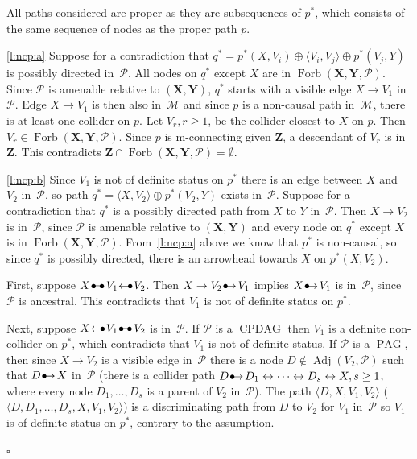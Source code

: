 \documentclass[11pt,a4paper]{article}
\newenvironment{proofof}[1][]{\begin{trivlist}
   \item[\hskip \labelsep {\bfseries Proof of #1.}]}{\hfill{}$\square$\end{trivlist}}
\DeclareMathOperator{\CPDAG}{CPDAG}
\DeclareMathOperator{\PAG}{PAG}
\DeclareMathOperator{\Adj}{Adj}
\DeclareMathOperator{\Forbi}{Forb}
\newcommand{\g}[1][G]{\mathcal{#1}}
\newcommand{\fb}[2][X,Y]{\Forbi(\mathbf{#1},#2)}%
\newcommand{\pstar}[1][p]{{#1}^{*}}
\newcommand{\bulletbullet}{
  \setlength{\unitlength}{1mm}
  \begin{picture}(5,1)(0,0)
    \put(0.2,0){$\bullet$}
    \put(1.3,1){\line(1,0){2.4}}
    \put(2.8,0){$\bullet$}
  \end{picture}
}
\newcommand{\bulletarrow}{
  \setlength{\unitlength}{1mm}
  \begin{picture}(5,1)(0,0)
    \put(0.2,0){$\bullet$}
    \put(1,0){$\rightarrow$}
  \end{picture}
}
\newcommand{\arrowbullet}{
  \setlength{\unitlength}{1mm}
  \begin{picture}(5,1)(0,0)
    \put(0.2,0){$\leftarrow$}
    \put(3,0){$\bullet$}
  \end{picture}
}
\begin{document}
\begin{proofof}[Lemma~\ref{lemma:non-causal path}]
All paths considered are proper as they are subsequences of $\pstar$, which consists of the same sequence of nodes as the proper path $p$.

\ref{l:ncp:a} Suppose for a contradiction that $\pstar[q] = \pstar(X,V_i) \oplus \langle V_i, V_j \rangle \oplus \pstar(V_j,Y) $ is possibly directed in~$\g[P]$. All nodes on $\pstar[q]$ except $X$ are in $\fb{\g[P]}$. Since $\g[P]$ is amenable relative to $(\mathbf{X,Y})$, $\pstar[q]$ starts with a visible edge $X \rightarrow V_1$ in~$\g[P]$.
Edge $X \rightarrow V_1$ is then also in~$\g[M]$ and since $p$ is a non-causal path in~$\g[M]$, there is at least one collider on $p$.
Let $V_r, r \ge 1$, be the collider closest to $X$ on $p$. Then $V_r \in \fb{\g[P]}$. Since $p$ is m-connecting given $\mathbf{Z}$, a descendant of $V_r$ is in $\mathbf{Z}$. This contradicts $\mathbf{Z} \cap \fb{\g[P]} = \emptyset$.


\ref{l:ncp:b} Since $V_1$ is not of definite status on $\pstar$ there is an edge between $X$ and $V_2$ in~$\g[P]$, so path $\pstar[q]= \langle X,V_2 \rangle \oplus \pstar(V_2,Y) $ exists in~$\g[P]$.
Suppose for a contradiction that $\pstar[q]$ is a possibly directed path from $X$ to $Y$ in~$\g[P]$. Then $X \to V_2$ is in~$\g[P]$, since $\g[P]$ is amenable relative to $(\mathbf{X,Y})$ and every node on $\pstar[q]$ except $X$ is in $\fb{\g[P]}$.
From~\ref{l:ncp:a} above we know that $\pstar$ is non-causal, so since $\pstar[q]$ is possibly directed, there is an arrowhead towards $X$ on $\pstar(X,V_2)$.

First, suppose $X \bulletbullet V_1 \arrowbullet V_2$. Then $X \rightarrow V_2 \bulletarrow V_1$ implies $X \bulletarrow V_1$ is in~$\g[P]$, since $\g[P]$ is ancestral. This contradicts that $V_1$ is not of definite status on $\pstar$.

Next, suppose $X \arrowbullet V_1 \bulletbullet V_2$ is in~$\g[P]$. If $\g[P]$ is a $\CPDAG$ then $V_1$ is a definite non-collider on $\pstar$, which contradicts that $V_1$ is not of definite status.
If $\g[P]$ is a $\PAG$, then since $X \rightarrow V_{2}$ is a visible edge in~$\g[P]$ there is a node $D \notin \Adj(V_2,\g[P])$ such that $D \bulletarrow X$ in~$\g[P]$ (there is a collider path $D \bulletarrow D_1 \leftrightarrow \dots \leftrightarrow D_s \leftrightarrow X, s \ge 1$, where every node $D_1,\dots , D_s$ is a parent of $V_{2}$ in~$\g[P]$).
   The path $\langle D,X,V_1,V_{2} \rangle$ ($\langle D,D_1, \dots ,D_s,X,V_1,V_{2} \rangle$) is a discriminating path from $D$ to $V_2$ for $V_1$ in~$\g[P]$ so $V_1$ is of definite status on $\pstar$, contrary to the assumption.


\end{proofof}
\end{document}
